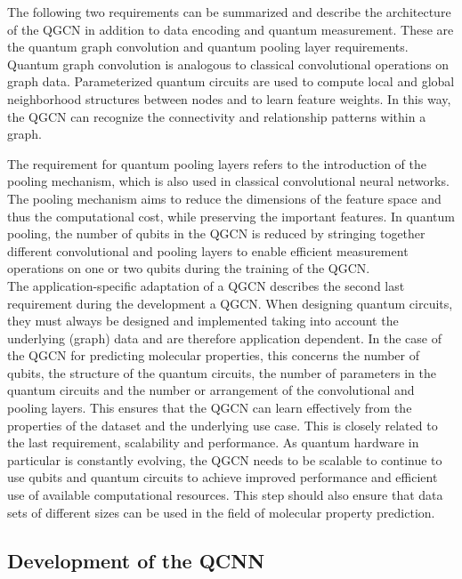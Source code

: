 The following two requirements can be summarized and describe the architecture of the QGCN in addition to data encoding and quantum measurement. These are the quantum graph convolution and quantum pooling layer requirements. Quantum graph convolution is analogous to classical convolutional operations on graph data. Parameterized quantum circuits are used to compute local and global neighborhood structures between nodes and to learn feature weights. In this way, the QGCN can recognize the connectivity and relationship patterns within a graph.

The requirement for quantum pooling layers refers to the introduction of the pooling mechanism, which is also used in classical convolutional neural networks. The pooling mechanism aims to reduce the dimensions of the feature space and thus the computational cost, while preserving the important features. In quantum pooling, the number of qubits in the QGCN is reduced by stringing together different convolutional and pooling layers to enable efficient measurement operations on one or two qubits during the training of the QGCN. \\

The application-specific adaptation of a QGCN describes the second last requirement during the development a QGCN. When designing quantum circuits, they must always be designed and implemented taking into account the underlying (graph) data and are therefore application dependent. In the case of the QGCN for predicting molecular properties, this concerns the number of qubits, the structure of the quantum circuits, the number of parameters in the quantum circuits and the number or arrangement of the convolutional and pooling layers. This ensures that the QGCN can learn effectively from the properties of the dataset and the underlying use case. This is closely related to the last requirement, scalability and performance. As quantum hardware in particular is constantly evolving, the QGCN needs to be scalable to continue to use qubits and quantum circuits to achieve improved performance and efficient use of available computational resources. This step should also ensure that data sets of different sizes can be used in the field of molecular property prediction.

\label{subsec:requirements}
\subsection{Development of the QCNN}
\label{subsec:qgnndevelopment}

